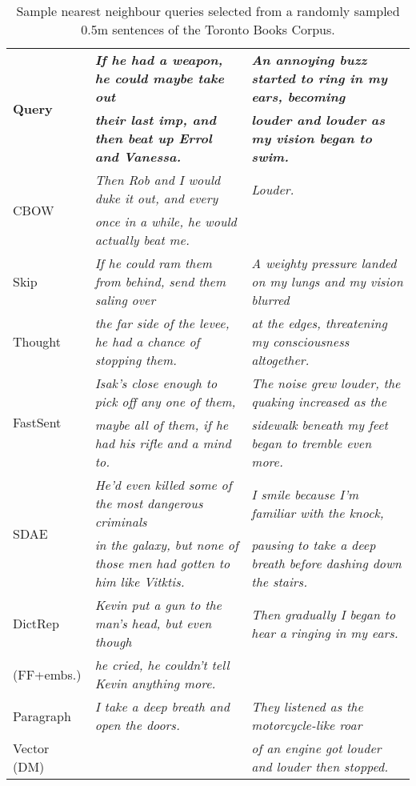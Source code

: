 \begin{table*}[ht]
\begin{adjustwidth}{-1cm}{}
\renewcommand{\tabcolsep}{4.6pt}
\footnotesize
  \begin{center}
      {
        \begin{tabular}{l|l|l}
           \multirow{2}{*}{\bf Query} &  \bf \emph{If he had a weapon, he could maybe take out} & \bf \emph{An annoying buzz started to ring in my ears, becoming}  \\
           &\bf \emph{their last imp, and then beat up Errol and Vanessa.} & \bf  \emph{louder and louder as my vision began to swim. } \\
\hline
\hline
           \multirow{2}{*}{CBOW} &  \emph{Then Rob and I would duke it out, and every} &  \emph{Louder.}  \\
           &\emph{once in a while, he would actually beat me.} & 
\\
\hline
           \multirow{1}{*}{Skip} &  \emph{If he could ram them from behind, send them saling over } &  \emph{A weighty pressure landed on my lungs and my vision blurred} \\
           Thought&\emph{the far side of the levee, he had a chance of stopping them.} &  \emph{at the edges, threatening my consciousness altogether.}
\\
\hline
           \multirow{2}{*}{FastSent} &  \emph{Isak's close enough to pick off any one of them,} &  \emph{The noise grew louder, the quaking increased as the} \\
           &\emph{maybe all of them, if he had his rifle and a mind to. } &  \emph{sidewalk beneath my feet began to tremble even more.}
\\
\hline

           \multirow{2}{*}{SDAE} &  \emph{He'd even killed some of the most dangerous criminals} &  \emph{I smile because I'm familiar with the knock,} \\
           &\emph{in the galaxy, but none of those men had gotten to him like Vitktis.} &  \emph{pausing to take a deep breath before dashing down the stairs.}
\\
\hline
           \multirow{1}{*}{DictRep} &  \emph{Kevin put a gun to the man's head, but even though} &  \emph{Then gradually I began to hear a ringing in my ears.}  \\
         (FF+embs.)  &\emph{he cried, he couldn't tell Kevin anything more.} & \emph{}
\\\hline
           \multirow{1}{*}{Paragraph} &  \emph{I take a deep breath and open the doors.} &  \emph{They listened as the motorcycle-like roar}  \\
       Vector (DM) & & \emph{of an engine got louder and louder then stopped.}
\\
        \end{tabular}
    }
    \caption{\label{neighbours}Sample nearest neighbour queries selected from a randomly sampled 0.5m sentences of the Toronto Books Corpus.}
  \end{center}
  \vspace*{-4ex}
  \end{adjustwidth}
\end{table*}

